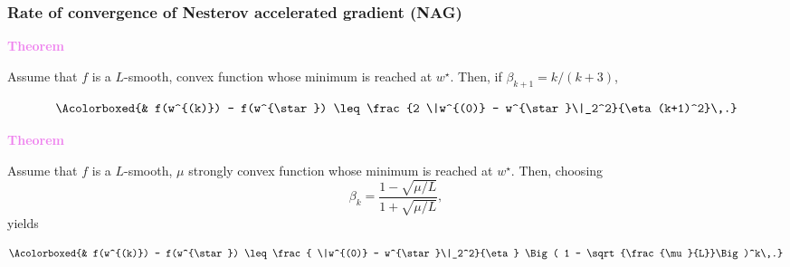 \documentclass[xcolor={usenames,dvipsnames}]{beamer}
\begin{document}
\begin{frame}
\frametitle{Rate of convergence of Nesterov accelerated gradient (NAG)}

\textbf{\textcolor{violet}{Theorem}}

Assume that $f$ is a \alert{$L$-smooth, convex function whose minimum is reached at $w^{\star}$}. Then, if $\beta_{k+1} = k/(k+3)$,

\begin{align*}
\Acolorboxed{&
f(w^{(k)}) - f(w^{\star}) \leq \frac{2 \|w^{(0)} - w^{\star}\|_2^2}{\eta (k+1)^2}\,.}
\end{align*}


\textbf{\textcolor{violet}{Theorem}}

Assume that $f$ is a \alert{$L$-smooth, $\mu$ strongly convex function whose minimum is reached at $w^{\star}$}. Then, choosing
$$
\beta_{k} = \frac{1 - \sqrt{\mu/L}}{1 + \sqrt{\mu/L}},
$$
yields

\begin{align*}
\Acolorboxed{&
f(w^{(k)}) - f(w^{\star}) \leq \frac{ \|w^{(0)} - w^{\star}\|_2^2}{\eta} \Big( 1 - \sqrt{\frac{\mu}{L}}\Big)^k\,.}
\end{align*}


\end{frame}

%
%
%
%
%
%
%
%
%
%
%
%
\end{document}
